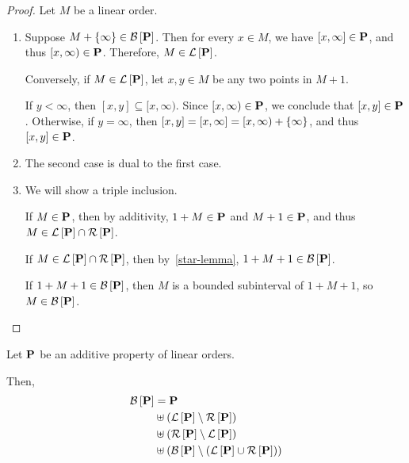 \begin{proof}
  Let $M$ be a linear order.

  \begin{enumerate}
    \item
          Suppose $M + \left\{ {\infty} \right\} \in \mathcal{B} \left[ {{\mathbf{P}}} \right]$.
          Then for every $x \in M$, we have $[x, \infty] \in \mathbf{P}$,
          and thus $[x, \infty) \in \mathbf{P}$.
          Therefore, $M \in \mathcal{L} \left[ {{\mathbf{P}}} \right]$.

          Conversely, if $M \in \mathcal{L} \left[ {{\mathbf{P}}} \right]$,
          let $x, y \in M$ be any two points in $M + 1$.

          If $y < \infty$, then $[x, y] \subseteq [x, \infty)$.
          Since $[x, \infty) \in \mathbf{P}$, we conclude that $[x, y] \in \mathbf{P}$.
          Otherwise, if $y = \infty$, then $[x, y] = [x, \infty] =
            [x, \infty) + \left\{ {\infty} \right\}$, and thus $[x, y] \in \mathbf{P}$.

    \item
          The second case is dual to the first case.

    \item
          We will show a triple inclusion.

          If $M \in \mathbf{P}$, then by additivity,
          $1 + M \in \mathbf{P}$ and $M + 1 \in \mathbf{P}$,
          and thus $M \in \mathcal{L} \left[ {{\mathbf{P}}} \right] \cap \mathcal{R} \left[ {{\mathbf{P}}} \right]$.

          If $M \in \mathcal{L} \left[ {{\mathbf{P}}} \right] \cap \mathcal{R} \left[ {{\mathbf{P}}} \right]$, then by~\cref{star-lemma},
          $1 + M + 1 \in \mathcal{B} \left[ {{\mathbf{P}}} \right]$.

          If $1 + M + 1 \in \mathcal{B} \left[ {{\mathbf{P}}} \right]$, then $M$ is a bounded
          subinterval of $1 + M + 1$, so $M \in \mathcal{B} \left[ {{\mathbf{P}}} \right]$.
  \end{enumerate}
\end{proof}

\begin{lemma}\label{bounded-decomposition}
  Let $\mathbf{P}$ be an additive property of linear orders.

  Then,
  \[
    \begin{aligned}
      \mathcal{B} \left[ {{\mathbf{P}}} \right] & = \mathbf{P}                                                            \\
                    & \uplus \left( {\mathcal{L} \left[ {{\mathbf{P}}} \right] \setminus \mathcal{R} \left[ {{\mathbf{P}}} \right]} \right)                          \\
                    & \uplus \left( {\mathcal{R} \left[ {{\mathbf{P}}} \right] \setminus \mathcal{L} \left[ {{\mathbf{P}}} \right]} \right)                          \\
                    & \uplus \left( { \mathcal{B} \left[ {{\mathbf{P}}} \right] \setminus \left( {\mathcal{L} \left[ {{\mathbf{P}}} \right] \cup \mathcal{R} \left[ {{\mathbf{P}}} \right]} \right)} \right)
    \end{aligned}
  \]
\end{lemma}

